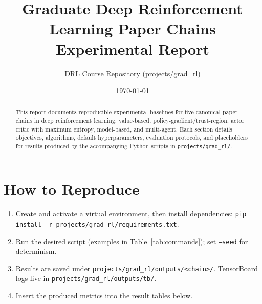 \documentclass[11pt]{article}
\title{Graduate Deep Reinforcement Learning Paper Chains\\Experimental Report}
\author{DRL Course Repository (projects/grad\_rl)}
\date{\today}
\newcommand{\code}[1]{\texttt{#1}}
\begin{document}
\maketitle
\begin{abstract}
This report documents reproducible experimental baselines for five canonical paper chains in deep reinforcement learning: value-based, policy-gradient/trust-region, actor--critic with maximum entropy, model-based, and multi-agent. Each section details objectives, algorithms, default hyperparameters, evaluation protocols, and placeholders for results produced by the accompanying Python scripts in \code{projects/grad\_rl/}.
\end{abstract}

\section{How to Reproduce}
\begin{enumerate}[leftmargin=*]
    \item Create and activate a virtual environment, then install dependencies: \code{pip install -r projects/grad\_rl/requirements.txt}.
    \item Run the desired script (examples in Table~\ref{tab:commands}); set \code{--seed} for determinism.
    \item Results are saved under \code{projects/grad\_rl/outputs/<chain>/}. TensorBoard logs live in \code{projects/grad\_rl/outputs/tb/}.
    \item Insert the produced metrics into the result tables below.
\end{enumerate}
\end{document}
